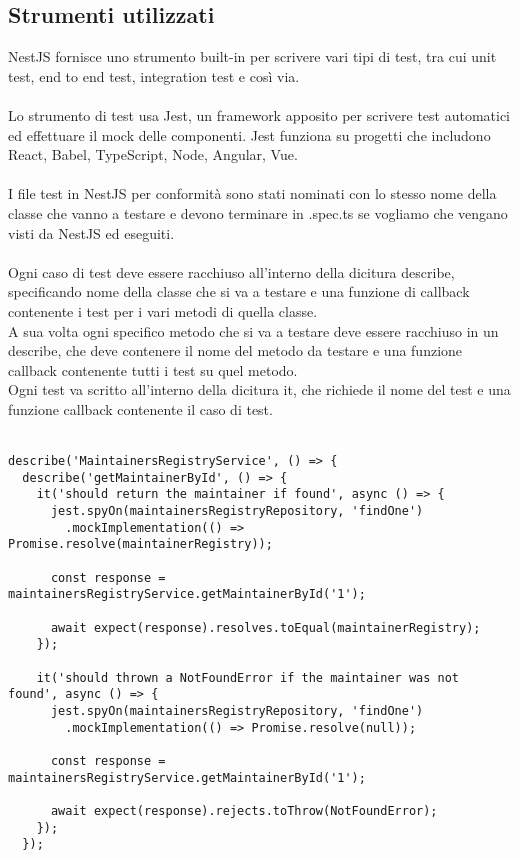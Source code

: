 \subsection{Strumenti utilizzati}
NestJS fornisce uno strumento built-in per scrivere vari tipi di test, tra cui unit test, 
end to end test, integration test e così via. 
\\\\
Lo strumento di test usa Jest, un framework apposito per scrivere test automatici ed effettuare 
il \gls{mock} delle componenti. Jest funziona su progetti che includono  React, Babel, TypeScript, Node,
Angular, Vue.
\\\\
I file test in NestJS per conformità sono stati nominati con lo stesso nome della classe che vanno
a testare e devono terminare in .spec.ts se vogliamo che vengano visti da NestJS ed eseguiti.
\\\\
Ogni caso di test deve essere racchiuso all'interno della dicitura describe, specificando nome della
classe che si va a testare e una funzione di callback contenente i test per i vari metodi di quella classe.
\\
A sua volta ogni specifico metodo che si va a testare deve essere racchiuso in un describe, che deve
contenere il nome del metodo da testare e una funzione callback contenente tutti i test su quel metodo.
\\
Ogni test va scritto all'interno della dicitura it, che richiede il nome del test e una funzione callback
contenente il caso di test.
\\\\
\begin{lstlisting}
describe('MaintainersRegistryService', () => {
  describe('getMaintainerById', () => {
    it('should return the maintainer if found', async () => {
      jest.spyOn(maintainersRegistryRepository, 'findOne')
        .mockImplementation(() => Promise.resolve(maintainerRegistry));

      const response = maintainersRegistryService.getMaintainerById('1');

      await expect(response).resolves.toEqual(maintainerRegistry);
    });

    it('should thrown a NotFoundError if the maintainer was not found', async () => {
      jest.spyOn(maintainersRegistryRepository, 'findOne')
        .mockImplementation(() => Promise.resolve(null));

      const response = maintainersRegistryService.getMaintainerById('1');

      await expect(response).rejects.toThrow(NotFoundError);
    });
  });
\end{lstlisting}

